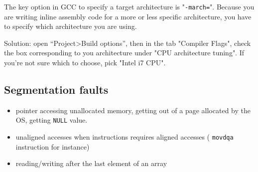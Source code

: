 \documentclass{article}
\begin{document}
The key option in GCC to specify a target architecture is "\verb+-march=+".
Because you are writing inline assembly code for a more or less specific architecture, you have to specify which architecture you are using.

Solution: open “Project>Build options”, then in the tab "Compiler Flags", check the box corresponding to you architecture under "CPU architecture tuning".
If you're not sure which to choose, pick "Intel i7 CPU".

\subsection{Segmentation faults}
\begin{itemize}
\item  pointer accessing unallocated memory, getting out of a page allocated by the OS, getting  \verb+NULL+ value.
\item unaligned accesses when instructions requires aligned accesses ( \verb+movdqa+ instruction for instance)
\item reading/writing after the last element of an array
\end{itemize}

\end{document}
